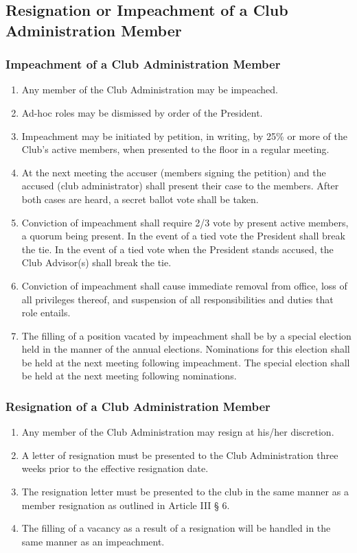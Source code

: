 \documentclass[english,11pt]{article}
\begin{document}
\subsection{Resignation or Impeachment of a Club Administration Member}
\subsubsection{Impeachment of a Club Administration Member}

\begin{enumerate}[label=\alph*.]
\item Any member of the Club Administration may be impeached.
\item Ad-hoc roles may be dismissed by order of the President.
\item Impeachment may be initiated by petition, in writing, by 25\% or more of the Club’s active members, when presented to the floor in a regular meeting.
\item At the next meeting the accuser (members signing the petition) and the accused (club administrator) shall present their case to the members.
      After both cases are heard, a secret ballot vote shall be taken.
\item Conviction of impeachment shall require 2/3 vote by present active members, a quorum being present.
      In the event of a tied vote the President shall break the tie.
      In the event of a tied vote when the President stands accused, the Club Advisor(s) shall break the tie.
\item Conviction of impeachment shall cause immediate removal from office, loss of all privileges thereof, and suspension of all responsibilities and duties that role entails.
\item The filling of a position vacated by impeachment shall be by a special election held in the manner of the annual elections.
      Nominations for this election shall be held at the next meeting following impeachment.
      The special election shall be held at the next meeting following nominations.
\end{enumerate}

\subsubsection{Resignation of a Club Administration Member}

\begin{enumerate}[label=\alph*.]
\item Any member of the Club Administration may resign at his/her discretion.
\item A letter of resignation must be presented to the Club Administration three weeks prior to the effective resignation date.
\item The resignation letter must be presented to the club in the same manner as a member resignation as outlined in Article III § 6.
\item The filling of a vacancy as a result of a resignation will be handled in the same manner as an impeachment.
\end{enumerate}
\end{document}
